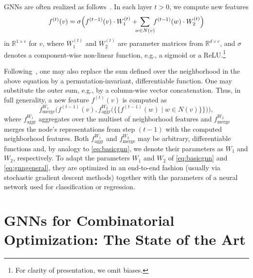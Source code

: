 \documentclass[twoside,11pt]{article}
\newcommand{\oms}{\{\!\!\{}
\newcommand{\cms}{\}\!\!\}}
\newcommand{\bbR}{\ensuremath{\mathbb{R}}}
\newcommand{\cm}[1]{{{\textcolor{orange}{\textbf{[CM:} {#1}\textbf{]}}}}}
\begin{document}
GNNs are often realized as follows~\citep{Morris2019a}. In each layer $t > 0$,  we compute new features
\begin{equation}\label{eq:basicgnn}
	f^{(t)}(v) = \sigma \Big( f^{(t-1)}(v) \cdot  W^{(t)}_1 +\, \sum_{\mathclap{w \in N(v)}}\,\, f^{(t-1)}(w) \cdot W_2^{(t)} \Big)
\end{equation}
in  $\bbR^{1 \times e}$ for $v$, where
$W_1^{(t)}$ and $W_2^{(t)}$ are parameter matrices from $\bbR^{d \times e}$, and $\sigma$ denotes a component-wise non-linear function, e.g., a sigmoid or a ReLU.\footnote{For clarity of presentation, we omit biases.}

Following~\cite{Gil+2017}, one may also replace the sum defined over the neighborhood in the above equation by a permutation-invariant, differentiable function. One may substitute the outer sum, e.g., by a column-wise vector concatenation.
Thus, in full generality, a new feature $f^{(t)}(v)$ is computed as
\begin{equation}\label{eq:gnngeneral}
	f^{W_1}_{\text{merge}}\Big(f^{(t-1)}(v) ,f^{W_2}_{\text{aggr}}\big(\oms f^{(t-1)}(w) \mid  w \in N(v)\cms \big)\!\Big),
\end{equation}
where $f^{W_1}_{\text{aggr}}$ aggregates over the multiset of neighborhood features and $f^{W_2}_{\text{merge}}$ merges the node's representations from step $(t-1)$ with the computed neighborhood features.
Both $f^{W_1}_{\text{aggr}}$ and $f^{W_2}_{\text{merge}}$ may be arbitrary, differentiable functions and, by analogy to \eqref{eq:basicgnn}, we denote their parameters as $W_1$ and $W_2$, respectively. To adapt the parameters $W_1$ and $W_2$ of \eqref{eq:basicgnn} and \eqref{eq:gnngeneral}, they are optimized in an end-to-end fashion (usually via stochastic gradient descent methods) together with the parameters of a neural network used for classification or regression.

\section{GNNs for Combinatorial Optimization: The State of the Art}\label{cognn}
\end{document}
